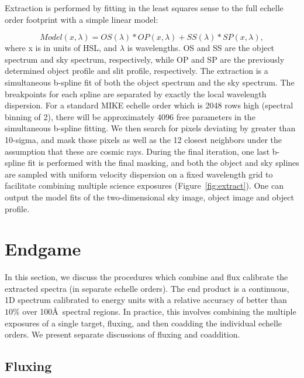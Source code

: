 \documentclass[]{emulateapj}
\begin{document}
Extraction is performed by fitting in the least squares sense 
to the full echelle order footprint with a simple linear model:

\begin{equation}
Model(x,\lambda)= OS(\lambda) * OP(x,\lambda)+ SS(\lambda) * SP(x,\lambda),
\end{equation}
where x is in units of HSL, and $\lambda$ is wavelengths.  OS and SS are the
object spectrum and sky spectrum, respectively, while OP and SP are the 
previously determined object profile and slit profile, respectively.
The extraction is a simultaneous b-spline fit of both the object spectrum and
the sky spectrum.  The breakpoints for each spline are separated by exactly
the local wavelength dispersion. For a standard MIKE echelle order
which is 2048 rows high (spectral binning of 2), there will be approximately
4096 free parameters in the simultaneous b-spline fitting.  
We then search for pixels deviating by greater than 10-sigma, and mask those
pixels as well as the 12 closest neighbors
under the assumption that these are cosmic rays.
During the final iteration, one last b-spline fit is performed with the final
masking, and both the object and sky splines are sampled with uniform 
velocity dispersion on a fixed wavelength grid to facilitate 
combining multiple science exposures (Figure~\ref{fig:extract}).  One can output
the model fits of the two-dimensional sky image,
 object image and object profile. 

 
\section{Endgame}
\label{sec:endgame}

In this section, we discuss the procedures which combine and 
flux calibrate the extracted spectra (in separate echelle orders).
The end product is a continuous, 1D spectrum calibrated to 
energy units with a relative accuracy of better than $10\%$ over
100\AA\ spectral regions.
In practice, this involves combining the 
multiple exposures of a single target, fluxing, and then 
coadding the individual echelle orders.  We present separate
discussions of fluxing and coaddition.

\subsection{Fluxing}
\end{document}
